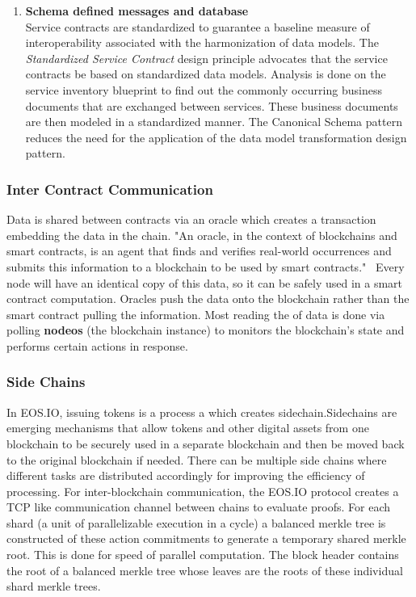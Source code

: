 \documentclass[]{article}
\begin{document}
\begin{enumerate}
	\item \textbf{Schema defined messages and database} \\
	Service contracts are standardized to guarantee a baseline measure of interoperability associated with the harmonization of data models.
	The \textit{Standardized Service Contract} design principle advocates that the service contracts be based on standardized data models. Analysis is done on the service inventory blueprint to find out the commonly occurring business documents that are exchanged between services. These business documents are then modeled in a standardized manner. The Canonical Schema pattern reduces the need for the application of the data model transformation design pattern.
	\cite{1}
	
	


	
		
\end{enumerate}
	 
	\subsubsection{Inter Contract Communication}
	Data is shared between contracts via an oracle which creates a transaction embedding the data in the chain. 
	"An oracle, in the context of blockchains and smart contracts, is an agent that finds and verifies real-world occurrences and submits this information to a blockchain to be used by smart contracts."\ 
	\cite{2}
	Every node will have an identical copy of this data, so it can be safely used in a smart contract computation.
	Oracles push the data onto the blockchain rather than the smart contract pulling the information.
	Most reading the of data is done via polling \textbf{nodeos} (the blockchain instance) to monitors the blockchain's state and performs certain actions in response. 
	
	
	\subsubsection{Side Chains}
	In EOS.IO, issuing tokens is a process a which creates sidechain.Sidechains are emerging mechanisms that allow tokens and other digital assets from one blockchain to be securely used in a separate blockchain and then be moved back to the original blockchain if needed. 
	There can be multiple side chains where different tasks are distributed accordingly for improving the efficiency of processing. 	
	For inter-blockchain communication, the EOS.IO protocol creates a TCP like communication channel between chains to evaluate proofs.
	For each shard (a unit of parallelizable execution in a cycle) a balanced merkle tree is constructed of these action commitments to generate a temporary shared merkle root. 
	This is done for speed of parallel computation. The block header contains the root of a balanced merkle tree whose leaves are the roots of these individual shard merkle trees.
	\cite{3} 
\end{document}
